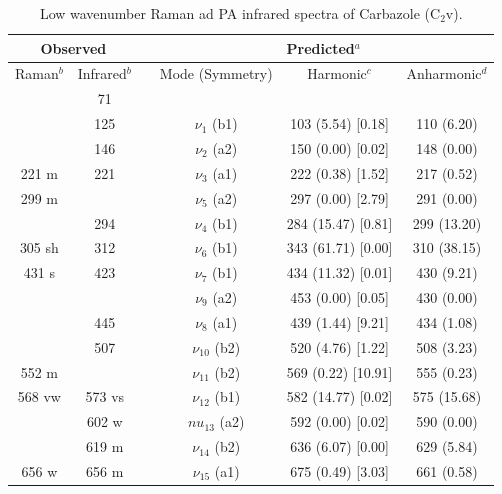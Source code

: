 	
	\begin{table}[H]
		\caption{Low wavenumber Raman ad PA infrared spectra of Carbazole (C$_{2}$v).}
		\begin{center}
			\begin{threeparttable}
				\begin{tabular}{c c c c c c}
					\hline
					\multicolumn{ 2}{c}{Observed} & \multicolumn{1}{c}{} & \multicolumn{ 3}{c}{Predicted$^{a}$} \\ \hline
					Raman$^{b}$ & \multicolumn{1}{c}{Infrared$^{b}$} &  & \multicolumn{1}{c}{Mode (Symmetry)} & \multicolumn{1}{c}{Harmonic$^{c}$} & Anharmonic$^{d}$ \\ \hline
	 & \multicolumn{1}{c}{71} &  &  &  &  \\ 
	 & \multicolumn{1}{c}{125} &  & $\nu_{1}$ (b1) & 103 (5.54) [0.18] & 110 (6.20) \\ 
	 & \multicolumn{1}{c}{146} &  & $\nu_{2}$ (a2) & 150 (0.00) [0.02] & 148 (0.00) \\ 
	 221 m & \multicolumn{1}{c}{221} &  & $\nu_{3}$ (a1) & 222 (0.38) [1.52] & 217 (0.52) \\ 
	 299 m &  &  & $\nu_{5}$ (a2) & 297 (0.00) [2.79] & 291 (0.00) \\ 
	 & \multicolumn{1}{c}{294} &  & $\nu_{4}$ (b1) & 284 (15.47) [0.81] & 299 (13.20) \\ 
	 305 sh & \multicolumn{1}{c}{312} &  & $\nu_{6}$ (b1) & 343 (61.71) [0.00] & 310 (38.15) \\ 
	 431 s & \multicolumn{1}{c}{423} &  & $\nu_{7}$ (b1) & 434 (11.32) [0.01] & 430 (9.21) \\ 
	 &  &  & $\nu_{9}$ (a2) & 453 (0.00) [0.05] & 430 (0.00) \\
	 & \multicolumn{1}{c}{445} &  & $\nu_{8}$ (a1) & 439 (1.44) [9.21] & 434 (1.08) \\ 
	 & \multicolumn{1}{c}{507} &  & $\nu_{10}$ (b2)
	 & 520 (4.76) [1.22] & 508 (3.23) \\ 
	 
	 552 m &  &  & $\nu_{11}$ (b2) 
	 & 569 (0.22) [10.91] & 555 (0.23)
	 \\ 
	 568 vw & 573 vs &  & $\nu_{12}$ (b1)  & 582 (14.77) [0.02] &  575 (15.68)
	 \\ 
	 & 602 w &  & $nu_{13}$ (a2) & 592 (0.00) [0.02] & 590 (0.00) \\ 
	 & 619 m &  & $\nu_{14}$ (b2) & 636 (6.07) [0.00] & 629 (5.84) \\ 
	 656 w & 656 m &  & $\nu_{15}$ (a1)	 & 675 (0.49) [3.03] & 661 (0.58) \\ 
	

\end{tabular}
\end{threeparttable}
\end{center}
\end{table}
